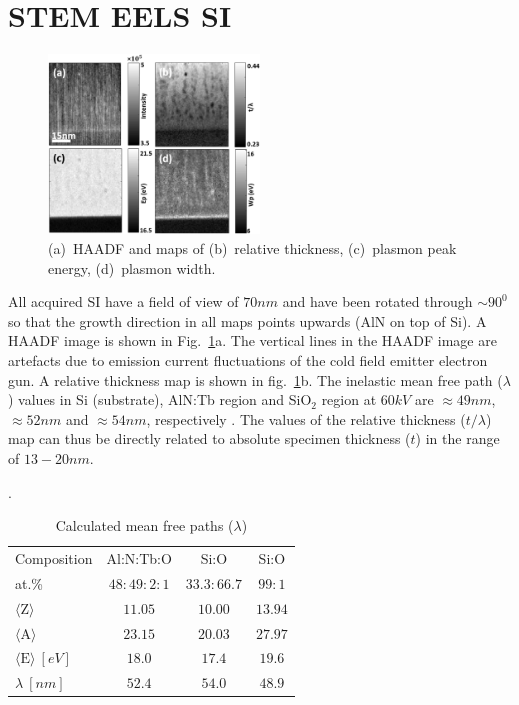 \documentclass[%
aip,
rsi,%
 amsmath,amssymb,%
 reprint,%
]{revtex4-1}
\begin{document}
\section{STEM EELS SI}
\label{sec:STEMEELSSI}
\begin{figure}
	\centering
    \includegraphics[width=0.5\textwidth]{combined_haadf}
    \caption{(a)~HAADF and maps of (b)~relative thickness, (c)~plasmon peak energy, (d)~plasmon width.}
    \label{fig:combined_haadf}
\end{figure}
All acquired SI have a field of view of $70nm$ and have been rotated through $\sim90^0$ so that the growth direction in all maps points upwards (AlN on top of Si). A HAADF image is shown in Fig.~\ref{fig:combined_haadf}a. The vertical lines in the HAADF image are artefacts due to emission current fluctuations of the cold field emitter electron gun. A relative thickness map is shown in fig.~\ref{fig:combined_haadf}b. The inelastic mean free path ($\lambda$) values in Si (substrate), AlN:Tb region and SiO$_2$ region at $60kV$ are $\approx49nm$, $\approx52nm$ and $\approx54nm$, respectively \cite{egerton2011}. The values of the relative thickness ($t/\lambda$) map can thus be directly related to absolute specimen thickness ($t$) in the range of $13-20nm$.
\begin{table}%
	\caption{Calculated mean free paths ($\lambda$)}.
    \label{tab:lambda}
    \begin{ruledtabular}
    	\begin{tabular}{lccc}
        	Composition&Al:N:Tb:O&Si:O&Si:O										\\
            at.\%&$48:49:2:1$&$33.3:66.7$&$99:1$								\\ \hline
        	$\langle \text{Z} \rangle$&$11.05$&$10.00$&$13.94$					\\
            $\langle \text{A} \rangle$&$23.15$&$20.03$&$27.97$					\\
            $\langle \text{E} \rangle~\left[eV\right]$&$18.0$&$17.4$&$19.6$		\\
           	$\lambda~\left[nm\right]$&$52.4$&$54.0$&$48.9$
    	\end{tabular}
    \end{ruledtabular}
\end{table}
\end{document}

